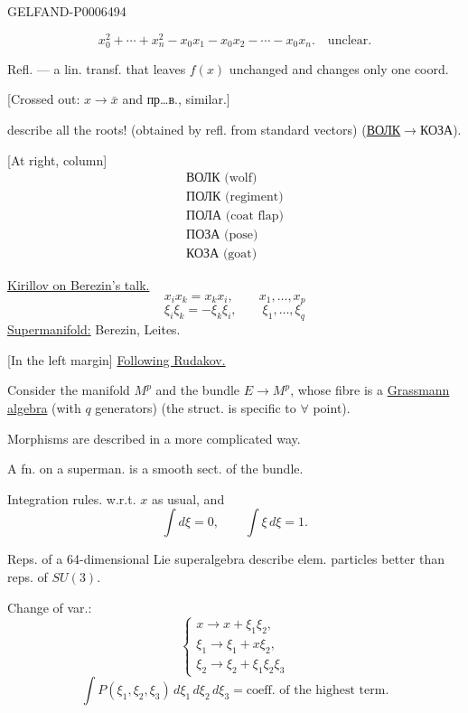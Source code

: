 \begin{GelfandAdjacentEvidence}{GELFAND-P000649}{4}

\[
x_0^2+\cdots+x_n^2-x_0x_1-x_0x_2-\cdots-x_0x_n.
\quad \text{unclear.}
\]

Refl. --- a lin. transf. that leaves \(f(x)\) unchanged and changes only one coord.

[Crossed out: \(x\to\bar x\) and пр\ldots в., similar.]
\end{GelfandAdjacentEvidence}

describe all the roots! (obtained by refl. from standard vectors) (\underline{ВОЛК}\(\to\)КОЗА).

[At right, column]
\begin{gather*}
\text{ВОЛК (wolf)}\\
\text{ПОЛК (regiment)}\\
\text{ПОЛА (coat flap)}\\
\text{ПОЗА (pose)}\\
\text{КОЗА (goat)}
\end{gather*}

\begin{center}\textemdash\enspace\textperiodcentered\enspace\textemdash\end{center}

\underline{Kirillov on Berezin’s talk.}
\[
x_i x_k=x_k x_i,\qquad x_1,\ldots,x_p
\]
\[
\xi_i\xi_k=-\xi_k\xi_i,\qquad \xi_1,\ldots,\xi_q
\]
\underline{Supermanifold:} Berezin, Leites.

[In the left margin] \underline{Following Rudakov.}

Consider the manifold \(M^p\) and the bundle \(E\to M^p\), whose fibre is a
\underline{Grassmann algebra} (with \(q\) generators)
(the struct. is specific to \(\forall\) point).

Morphisms are described in a more complicated way.

A fn. on a superman. is a smooth sect. of the bundle.

Integration rules. w.r.t. \(x\) as usual, and
\[
\int d\xi=0,\qquad \int\xi\,d\xi=1.
\]

Reps. of a 64-dimensional Lie superalgebra describe elem. particles better than reps. of \(SU(3)\).

Change of var.:
\[
\begin{cases}
x\to x+\xi_1\xi_2,\\
\xi_1\to\xi_1+x\xi_2,\\
\xi_2\to\xi_2+\xi_1\xi_2\xi_3
\end{cases}
\]
\[
\int P(\xi_1,\xi_2,\xi_3)\,d\xi_1\,d\xi_2\,d\xi_3
=\text{coeff. of the highest term.}
\]

